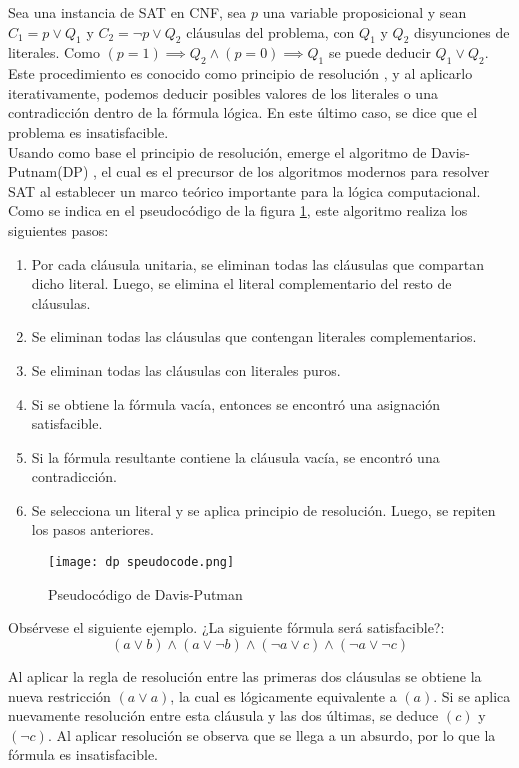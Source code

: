 \documentclass[12pt]{report}
\begin{document}
Sea una instancia de SAT en CNF, sea $p$ una variable proposicional y sean $C_1=p \lor  Q_1$  y  $C_2 = \neg p \lor  Q_2$ cláusulas del problema, con $Q_1$ y $Q_2$ disyunciones de literales. Como $(p=1)\implies  Q_2 \land (p=0)\implies  Q_1$ se puede deducir $Q_1\lor  Q_2$. Este procedimiento es conocido como principio de resolución \cite{Williams}, y al aplicarlo iterativamente, podemos deducir posibles valores de los literales o una contradicción dentro de la fórmula lógica. En este último caso, se dice que el problema es insatisfacible.\\ 

Usando como base el principio de resolución, emerge el algoritmo de Davis-Putnam(DP) \cite{D-P}, el cual es el precursor de los algoritmos modernos para resolver SAT al establecer  un marco teórico importante para la lógica computacional. Como se indica en el pseudocódigo de la figura \ref{fig:dp}, este algoritmo realiza los siguientes pasos:
\begin{enumerate}
    \item Por cada cláusula  unitaria, se eliminan todas las cláusulas que compartan dicho literal. Luego, se elimina el literal complementario del resto de cláusulas.
    \item Se eliminan todas las cláusulas que contengan literales complementarios.
    \item Se eliminan todas las cláusulas con literales puros.
    \item Si se obtiene la fórmula vacía, entonces se encontró una asignación satisfacible. 
    \item Si la fórmula resultante contiene la cláusula vacía, se encontró una contradicción.
    \item Se selecciona un literal y se aplica principio de resolución. Luego, se repiten los pasos anteriores.
\end{enumerate}

\begin{figure}[ht]
    \centering
    \texttt{[image: dp speudocode.png]}
    \caption{Pseudocódigo de Davis-Putman}
    \label{fig:dp}
\end{figure}


Obsérvese el siguiente ejemplo. ¿La siguiente fórmula será satisfacible?:
$$(a\lor  b) \land(a\lor  \neg b) \land (\neg a\lor  c) \land(\neg a\lor  \neg c)$$

Al aplicar la regla de resolución entre las primeras dos cláusulas se obtiene la nueva restricción $(a \lor  a)$, la cual es lógicamente equivalente a $(a)$. Si se aplica nuevamente resolución entre esta cláusula y las dos últimas, se deduce $(c)$ y $(\neg c)$. Al aplicar resolución se observa que se llega a un absurdo, por lo que la fórmula es insatisfacible. \\
\end{document}
